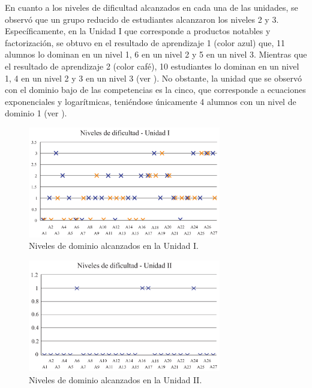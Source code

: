 \documentclass[spanish]{textolivre}
\begin{document}
En cuanto a los niveles de dificultad alcanzados en cada una de las unidades, se observó que un grupo reducido de estudiantes alcanzaron los niveles 2 y 3. Específicamente, en la Unidad I que corresponde a productos notables y factorización, se obtuvo en el resultado de aprendizaje 1 (color azul) que, 11 alumnos lo dominan en un nivel 1, 6 en un nivel 2 y 5 en un nivel 3. Mientras que el resultado de aprendizaje 2 (color café), 10 estudiantes lo dominan en un nivel 1, 4 en un nivel 2 y 3 en un nivel 3 (ver ). No obstante, la unidad que se observó con el dominio bajo de las competencias es la cinco, que corresponde a ecuaciones exponenciales y logarítmicas, teniéndose únicamente 4 alumnos con un nivel de dominio 1 (ver ). 

\begin{figure}[h!]
   \centering
   \includegraphics[width=0.75\textwidth]{fig-08.pdf}
   \caption{Niveles de dominio alcanzados en la Unidad I.}
   \label{fig:08}
\end{figure}

\begin{figure}[h!]
   \centering
   \includegraphics[width=0.75\textwidth]{fig-09.pdf}
   \caption{Niveles de dominio alcanzados en la Unidad II.}
   \label{fig:09}
\end{figure}
\end{document}
